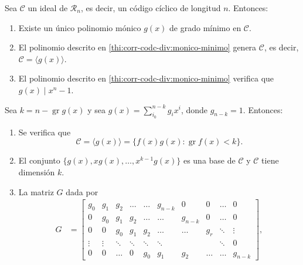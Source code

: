 \begin{theorem}
  \label{th:corr-cod-div}
  Sea \(\mathcal C\) un ideal de \(\mathcal R_n\), es decir, un código cíclico de longitud \(n\). Entonces:
  \begin{enumerate}
    \item Existe un único polinomio mónico \(g(x)\) de grado mínimo en \(\mathcal C\).\label{thi:corr-codc-div:monico-minimo}
    \item El polinomio descrito en \ref{thi:corr-codc-div:monico-minimo} genera \(\mathcal C\), es decir, \(\mathcal C = \langle g(x)\rangle\).
    \item El polinomio descrito en \ref{thi:corr-codc-div:monico-minimo} verifica que \(g(x) \mid x^n -1\).\label{thi:corr-codc-div:div-xn-1}
  \end{enumerate}
  Sea \(k = n - \operatorname{gr} g(x)\) y sea \(g(x) = \sum_{i_0}^{n-k}g_ix^{i}\), donde \(g_{n-k} = 1\). Entonces:
  \begin{enumerate}[resume]
    \item Se verifica que \[
      \mathcal C = \langle g(x) \rangle = \{f(x)g(x) : \operatorname{gr} f(x) < k\}.
    \]\label{thi:corr-codc-div:dim-ideal}
    \item El conjunto \(\{g(x), xg(x), \dots, x^{k-1}g(x)\}\) es una base de \(\mathcal C\) y \(\mathcal C\) tiene dimensión \(k\).
    \item La matriz \(G\) dada por \begin{align*}
      G &= \begin{bmatrix}
        g_0 & g_1 & g_2 & \dots & \dots & g_{n-k} & 0 & 0 & \dots & 0 \\
        0 & g_0 & g_1 & g_2 & \dots & \dots & g_{n-k} & 0 & \dots & 0 \\
        0 & 0 & g_0 & g_1 & g_2 & \dots & \dots & g_r & \ddots & \vdots \\
        \vdots & \vdots & \ddots & \ddots & \ddots & \ddots & & & \ddots & 0\\
        0 & 0 & \dots & 0 & g_0 & g_1 & g_2 & \dots & \dots & g_{n-k} 
      \end{bmatrix},

\end{align*}
\end{enumerate}
\end{theorem}
